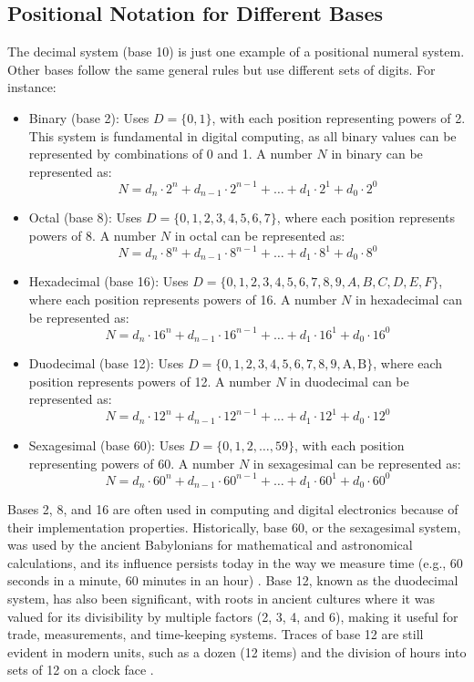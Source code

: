 \subsection{Positional Notation for Different Bases}
The decimal system (base 10) is just one example of a positional numeral system. Other bases follow the same general rules but use different sets of digits. For instance:
\begin{itemize}
    \item Binary (base 2): Uses \( D = \{0, 1\} \), with each position representing powers of 2. This system is fundamental in digital computing, as all binary values can be represented by combinations of 0 and 1. A number \( N \) in binary can be represented as:
    \[
    N = d_n \cdot 2^n + d_{n-1} \cdot 2^{n-1} + \ldots + d_1 \cdot 2^1 + d_0 \cdot 2^0
    \]

    \item Octal (base 8): Uses \( D = \{0, 1, 2, 3, 4, 5, 6, 7\} \), where each position represents powers of 8. A number \( N \) in octal can be represented as:
    \[
    N = d_n \cdot 8^n + d_{n-1} \cdot 8^{n-1} + \ldots + d_1 \cdot 8^1 + d_0 \cdot 8^0
    \]

    \item Hexadecimal (base 16): Uses \( D = \{0, 1, 2, 3, 4, 5, 6, 7, 8, 9, A, B, C, D, E, F\} \), where each position represents powers of 16. A number \( N \) in hexadecimal can be represented as:
    \[
    N = d_n \cdot 16^n + d_{n-1} \cdot 16^{n-1} + \ldots + d_1 \cdot 16^1 + d_0 \cdot 16^0
    \]

    \item Duodecimal (base 12): Uses \( D = \{0, 1, 2, 3, 4, 5, 6, 7, 8, 9, \text{A}, \text{B}\} \), where each position represents powers of 12. A number \( N \) in duodecimal can be represented as:
    \[
    N = d_n \cdot 12^n + d_{n-1} \cdot 12^{n-1} + \ldots + d_1 \cdot 12^1 + d_0 \cdot 12^0
    \]

    \item Sexagesimal (base 60): Uses \( D = \{0, 1, 2, \ldots, 59\} \), with each position representing powers of 60. A number \( N \) in sexagesimal can be represented as:
    \[
    N = d_n \cdot 60^n + d_{n-1} \cdot 60^{n-1} + \ldots + d_1 \cdot 60^1 + d_0 \cdot 60^0
    \]
\end{itemize}



Bases 2, 8, and 16 are often used in computing and digital electronics because of their implementation properties. Historically, base 60, or the sexagesimal system, was used by the ancient Babylonians for mathematical and astronomical calculations, and its influence persists today in the way we measure time (e.g., 60 seconds in a minute, 60 minutes in an hour) \cite{robson2008}. Base 12, known as the duodecimal system, has also been significant, with roots in ancient cultures where it was valued for its divisibility by multiple factors (2, 3, 4, and 6), making it useful for trade, measurements, and time-keeping systems. Traces of base 12 are still evident in modern units, such as a dozen (12 items) and the division of hours into sets of 12 on a clock face \cite{ifrah2000}.



